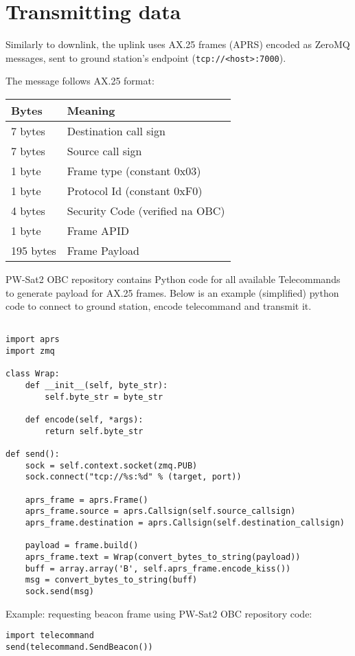 \section{Transmitting data}

Similarly to downlink, the uplink uses AX.25 frames (APRS) encoded as ZeroMQ messages, sent to ground station's endpoint (\texttt{tcp://<host>:7000}).

The message follows AX.25 format:


\begin{longtable}{l|l}
    \toprule
    \textbf{Bytes} & \textbf{Meaning} \\
    \midrule
    \endhead
    7 bytes & Destination call sign \\
    7 bytes & Source call sign \\
    1 byte & Frame type (constant 0x03) \\ 
    1 byte & Protocol Id (constant 0xF0) \\
    4 bytes & Security Code (verified na OBC) \\ 
    1 byte & Frame APID \\
    195 bytes & Frame Payload \\    
    \bottomrule
\end{longtable}

PW-Sat2 OBC repository contains Python code for all available Telecommands to generate payload for AX.25 frames. Below is an example (simplified) python code to connect to ground station, encode telecommand and transmit it. 

\begin{verbatim}

import aprs
import zmq

class Wrap:
    def __init__(self, byte_str):
        self.byte_str = byte_str

    def encode(self, *args):
        return self.byte_str

def send():
    sock = self.context.socket(zmq.PUB)
    sock.connect("tcp://%s:%d" % (target, port))

    aprs_frame = aprs.Frame()
    aprs_frame.source = aprs.Callsign(self.source_callsign)
    aprs_frame.destination = aprs.Callsign(self.destination_callsign)

    payload = frame.build()
    aprs_frame.text = Wrap(convert_bytes_to_string(payload))
    buff = array.array('B', self.aprs_frame.encode_kiss())
    msg = convert_bytes_to_string(buff)
    sock.send(msg)

\end{verbatim}

Example: requesting beacon frame using PW-Sat2 OBC repository code:

\begin{verbatim}
import telecommand
send(telecommand.SendBeacon())
\end{verbatim}